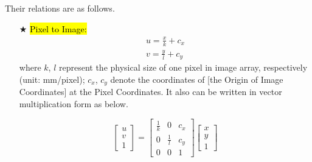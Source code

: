 \documentclass{article}
\begin{document}
Their relations are as follows. \begin{itemize}
	\item [$\bigstar$] \hl{Pixel to Image:}
		\begin{equation}
			\begin{array}{l}
				u = \frac{x}{k} + c_x \\
				v = \frac{y}{l} + c_y
			\end{array}
			\label{Eq_Pixel2Image}
		\end{equation}
		where $k$, $l$ represent the physical size of one pixel in image array, respectively (unit: mm/pixel); $c_x$, $c_y$ denote the coordinates of [the Origin of Image Coordinates] at the Pixel Coordinates. It also can be written in vector multiplication form as below. 
		
		\begin{equation}
			\left[\begin{array}{l}
			u \\
			v \\
			1
			\end{array}\right]= \left[\begin{array}{lll}
			\frac{1}{k} & 0 			& c_{x} \\
			0 			& \frac{1}{l}	& c_{y} \\
			0  			& 0 			   & 1
			\end{array}\right]\left[\begin{array}{l}
			x \\
			y \\
			1
			\end{array}\right]			
			\label{Eq_Pixel2Image_vector_format}
		\end{equation}
		

\end{itemize}
\end{document}
